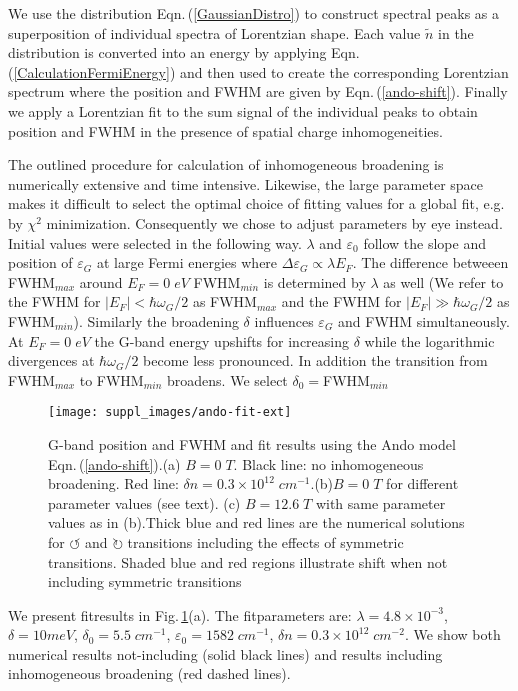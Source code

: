 \documentclass[pra,aps,superscriptaddress,preprint]{revtex4-1}
\begin{document}
We use the distribution Eqn.\,(\ref{GaussianDistro}) to construct spectral peaks as a superposition of individual spectra of Lorentzian shape. Each value $\widetilde{n}$ in the distribution is converted into an energy by applying Eqn.\,(\ref{CalculationFermiEnergy}) and then used to create the corresponding Lorentzian spectrum where the position and FWHM are given by Eqn.\,(\ref{ando-shift}). 
Finally we apply a Lorentzian fit to the sum signal of the individual peaks to obtain position and FWHM in the presence of spatial charge inhomogeneities.

The outlined procedure for calculation of inhomogeneous broadening is numerically extensive and time intensive. Likewise, the large parameter space makes it difficult to select the optimal choice of fitting values for a global fit, e.g. by $\chi^2$ minimization. Consequently we chose to adjust parameters by eye instead. Initial values were selected in the following way. $\lambda$ and $\varepsilon_0$ follow the slope and position of $\varepsilon_G$ at large Fermi energies where $\Delta \varepsilon_G \propto \lambda E_F$. The difference betweeen FWHM$_{max}$ around $E_F=0\; eV$ FWHM$_{min}$ is determined by $\lambda$ as well (We refer to the FWHM for $|E_F|<\hbar\omega_G /2$ as FWHM$_{max}$ and the FWHM for $|E_F|\gg \hbar\omega_G /2$ as FWHM$_{min}$). Similarly the broadening $\delta$ influences $\varepsilon_G$ and FWHM simultaneously. At $E_F=0\; eV$ the G-band energy upshifts for increasing $\delta$ while the logarithmic divergences at $\hbar\omega_G /2$ become less pronounced. In addition the transition from FWHM$_{max}$ to FWHM$_{min}$ broadens. We select $\delta_0=$FWHM$_{min}$

\begin{figure}[!ht]
   \texttt{[image: suppl\_images/ando-fit-ext]}
   \caption{\label{ando-fit-ext}G-band position and FWHM and fit results using the Ando model Eqn.\,(\ref{ando-shift}).(a) $B=0\; T$. Black line: no inhomogeneous broadening. Red line: $\delta n = 0.3\times 10^{12}\; cm^{-1}$.(b)$B=0\; T$ for different parameter values (see text). (c) $B=12.6\; T$ with same parameter values as in (b).Thick blue and red lines are the numerical solutions for $\circlearrowleft$ and $\circlearrowright$ transitions including the effects of symmetric transitions. Shaded blue and red regions illustrate shift when not including symmetric transitions}
\end{figure}

We present fitresults in Fig.\,\ref{ando-fit-ext}(a). The fitparameters are: $\lambda = 4.8\times 10^{-3}$, $\delta = 10meV$, $\delta_0=5.5\; cm^{-1}$, $\varepsilon_0 = 1582\; cm^{-1}$, $\delta n = 0.3\times 10^{12}\; cm^{-2}$. We show both numerical results not-including (solid black lines) and results including inhomogeneous broadening (red dashed lines).
\end{document}
